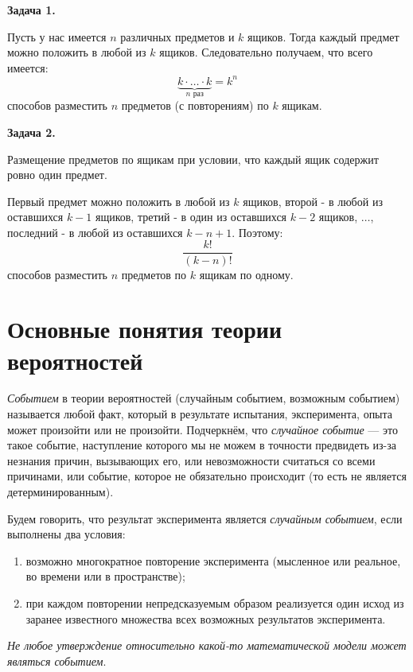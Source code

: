 \textbf{Задача 1.}

Пусть у нас имеется $n$ различных предметов и $k$ ящиков. Тогда каждый предмет можно положить в любой из $k$ ящиков. Следовательно получаем, что всего имеется:
\[ \underbrace{k \cdot \dots \cdot k}_{n \text{ раз}} = k^n \]
способов разместить $n$ предметов (с повторениям) по $k$ ящикам.

\textbf{Задача 2.}

Размещение предметов по ящикам при условии, что каждый ящик содержит ровно один предмет.

Первый предмет можно положить в любой из $k$ ящиков, второй - в любой из оставшихся $k-1$ ящиков, третий - в один из оставшихся $k-2$ ящиков, $\dots$, последний - в любой из оставшихся $k-n+1$. Поэтому:
\[ \dfrac{k!}{(k-n)!} \]
способов разместить $n$ предметов по $k$ ящикам по одному.

\section{Основные понятия теории вероятностей}

\begin{definition}
	\textit{Событием} в теории вероятностей (случайным событием, возможным событием) называется любой факт, который в результате испытания, эксперимента, опыта может произойти или не произойти. Подчеркнём, что \textit{случайное событие} — это такое событие, наступление которого мы не можем в точности предвидеть из-за незнания причин, вызывающих его, или невозможности считаться со всеми причинами, или событие, которое не обязательно происходит (то есть не является детерминированным).
	
	Будем говорить, что результат эксперимента является \textit{случайным событием}, если выполнены два условия:
	\begin{enumerate}
		\item возможно многократное повторение эксперимента (мысленное или реальное, во времени или в пространстве);
		\item при каждом повторении непредсказуемым образом реализуется один
		исход из заранее известного множества всех возможных результатов эксперимента.
	\end{enumerate}
\end{definition}
\begin{remark}
	\textit{Не любое утверждение относительно какой-то математической модели может являться событием}.
\end{remark}

